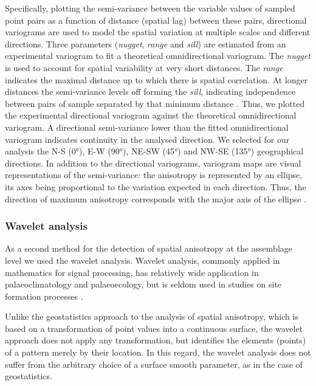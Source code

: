 \documentclass[5p,times,authoryear]{elsarticle}
\begin{document}
Specifically, plotting the semi-variance between the variable values of sampled point pairs as a function of distance (spatial lag) between these pairs, directional variograms are used to model the spatial variation at multiple scales and different directions. Three parameters (\emph{nugget}, \emph{range} and \emph{sill}) are estimated from an experimental variogram to fit a theoretical omnidirectional variogram. The \emph{nugget} is used to account for spatial variability at very short distances. The \emph{range} indicates the maximal distance up to which there is spatial correlation. At longer distances the semi-variance levels off forming the \emph{sill}, indicating independence between pairs of sample separated by that minimum distance \citep{Dale2014,Lloyd2004}. Thus, we plotted the experimental directional variogram against the theoretical omnidirectional variogram. A directional semi-variance lower than the fitted omnidirectional variogram indicates continuity in the analysed direction. We selected for our analysis the N-S (0°), E-W (90°), NE-SW (45°) and NW-SE (135°) geographical directions. In addition to the directional variograms, variogram maps are visual representations of the semi-variance: the anisotropy is represented by an ellipse, its axes being proportional to the variation expected in each direction. Thus, the direction of maximum anisotropy corresponds with the major axis of the ellipse \citep{Legendre2012}.

\subsubsection{Wavelet analysis}

As a second method for the detection of spatial anisotropy at the assemblage level we used the wavelet analysis. Wavelet analysis, commonly applied in mathematics for signal processing, has relatively wide application in palaeoclimatology and palaeoecology, but is seldom used in studies on site formation processes \citep{Markofsky2012}.

Unlike the geostatistics approach to the analysis of spatial anisotropy, which is based on a transformation of point values into a continuous surface, the wavelet approach does not apply any transformation, but identifies the elements (points) of a pattern merely by their location. In this regard, the wavelet analysis does not suffer from the arbitrary choice of a surface smooth parameter, as in the case of geostatistics.
\end{document}
